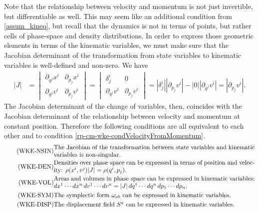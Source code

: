 Note that the relationship between velocity and momentum is not just invertible, but differentiable as well. This may seem like an additional condition from \ref{assum_kineq}, but recall that the dynamics is not in terms of points, but rather cells of phase-space and density distributions. In order to express those geometric elements in terms of the kinematic variables, we must make sure that the Jacobian determinant of the transformation from state variables to kinematic variables is well-defined and non-zero. We have
\begin{equation}\label{rp-cm-lm-JacobianMomentumVelocity}
	\begin{aligned}
		|J| &= \begin{vmatrix}
			\partial_{q^j} x^i & \partial_{p_j} x^i  \\
			\partial_{q^j} v^i & \partial_{p_j} v^i
		\end{vmatrix}
		= \begin{vmatrix}
			\delta^i_j & 0 \\
			\partial_{q^j} v^i & \partial_{p_j} v^i
		\end{vmatrix} 
		= \left|\delta^i_j\right| \left|\partial_{p_j} v^i\right| - |0| \left|\partial_{q^j} v^i\right| = \left|\partial_{p_j} v^i\right|.
	\end{aligned}
\end{equation}
The Jacobian determinant of the change of variables, then, coincides with the Jacobian determinant of the relationship between velocity and momentum at constant position. Therefore the following conditions are all equivalent to each other and to condition \ref{rp-cm-wke-condVelocityFromMomentum}.
\begin{align}
	\tag{WKE-NSIN}\label{rp-cm-wke-condJacobianNonSingular}
	&\eqtext{The Jacobian of the transformation between state variables and kinematic variables is non-singular.} \\
	\tag{WKE-DEN}\label{rp-cm-wke-condDensities}
	&\eqtext{Densities over phase space can be expressed in terms of position and velocity: $\rho(x^i, v^j) |J| = \rho(q^i, p_j)$.} \\
	\tag{WKE-VOL}\label{rp-cm-wke-condAreas}
	&\eqtext{Areas and volumes in phase space can be expressed in kinematic variables: $dx^1 \cdots dx^n \, dv^1 \cdots dv^n = |J| \, dq^1 \cdots dq^n \, dp_1 \cdots dp_n$.} \\
	\tag{WKE-SYM}\label{rp-cm-wke-condSymplectic}
	&\eqtext{The symplectic form $\omega_{ab}$ can be expressed in kinematic variables.} \\
	\tag{WKE-DISP}\label{rp-cm-wke-condDisplacement}
	&\eqtext{The displacement field $S^a$ can be expressed in kinematic variables.}
\end{align}


